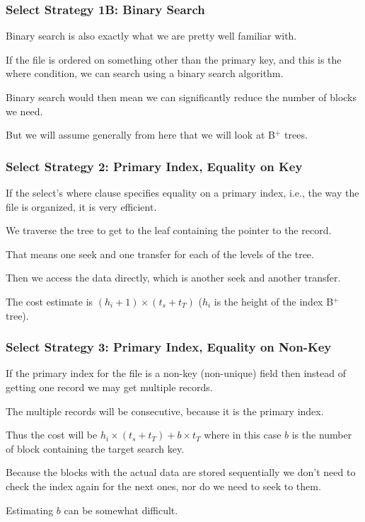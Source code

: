\begin{frame}
\frametitle{Select Strategy 1B: Binary Search}

Binary search is also exactly what we are pretty well familiar with. 

If the file is ordered on something other than the primary key, and this is the where condition, we can search using a binary search algorithm. 

Binary search would then mean we can significantly reduce the number of blocks we need. 

But we will assume generally from here that we will look at B$^{+}$ trees.

\end{frame}

\begin{frame}
\frametitle{Select Strategy 2: Primary Index, Equality on Key}

If the select's where clause specifies equality on a primary index, i.e., the way the file is organized, it is very efficient. 

We traverse the tree to get to the leaf containing the pointer to the record. 

That means one seek and one transfer for each of the levels of the tree. 

Then we access the data directly, which is another seek and another transfer. 

The cost estimate is $(h_{i} + 1) \times (t_{s} + t_{T})$  ($h_{i}$ is the height of the index B$^{+}$ tree).

\end{frame}


\begin{frame}
\frametitle{Select Strategy 3: Primary Index, Equality on Non-Key}

If the primary index for the file is a non-key (non-unique) field then instead of getting one record we may get multiple records. 


The multiple records will be consecutive, because it is the primary index. 

Thus the cost will be $h_{i} \times (t_{s} + t_{T}) + b \times t_{T}$ where in this case $b$ is the number of block containing the target search key.

 Because the blocks with the actual data are stored sequentially we don't need to check the index again for the next ones, nor do we need to seek to them.
 
 Estimating $b$ can be somewhat difficult.

\end{frame}

